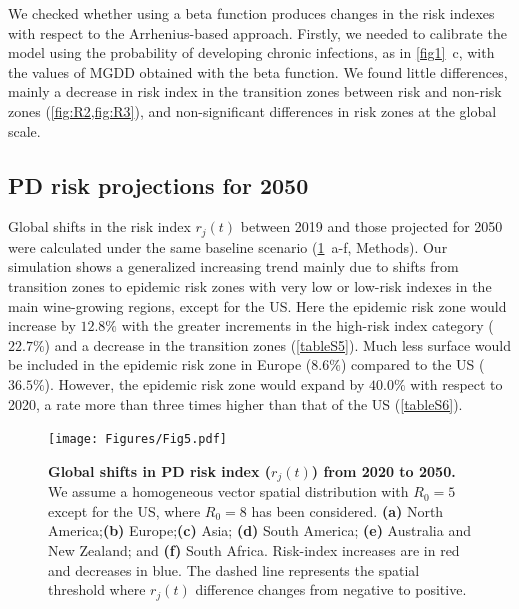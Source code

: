     We checked whether using a beta function produces changes in the risk
    indexes with respect to the Arrhenius-based approach. Firstly, we needed to
    calibrate the model using the probability of developing chronic infections,
    as in \cref{fig1}~\textcolor{ref_color}{c}, with the values of MGDD
    obtained with the beta
    function. We found little differences, mainly a decrease in risk index in
    the transition zones between risk and non-risk zones
    (\cref{fig:R2,fig:R3}), and non-significant differences in risk zones at
    the global scale.

    \subsection{PD risk projections for 2050}

    Global shifts in the risk index $r_j(t)$ between 2019 and those projected
    for 2050 were calculated under the same baseline scenario
    (\cref{fig5}~\textcolor{ref_color}{a-f},
    Methods). Our simulation shows a generalized increasing trend mainly due to
    shifts from transition zones to epidemic risk zones with very low or
    low-risk indexes in the main wine-growing regions, except for the US. Here
    the epidemic risk zone would increase by $12.8\%$ with the greater
    increments in the high-risk index category ($22.7\%$) and a decrease in the
    transition zones (\cref{tableS5}). Much less surface would be
    included in the epidemic risk zone in Europe ($8.6\%$) compared to the US
    ($36.5\%$). However, the epidemic risk zone would expand by $40.0\%$ with
    respect to 2020, a rate more than three times higher than
    that of the US (\cref{tableS6}).

    \begin{figure}[H]
        \centering
        \texttt{[image: Figures/Fig5.pdf]}
        \caption[Global shifts in PD risk index ($r_j(t)$) from 2020 to
            2050]{\textbf{Global shifts in PD risk index ($r_j(t)$) from 2020
                to
                2050.} We assume a homogeneous vector spatial distribution with
            $R_0=5$ except for the US, where $R_0=8$ has been
            considered. \textbf{(a)} North America;\textbf{(b)}
            Europe;\textbf{(c)} Asia; \textbf{(d)} South America; \textbf{(e)}
            Australia
            and New Zealand; and \textbf{(f)} South Africa. Risk-index
            increases are in red
            and decreases in blue. The dashed line represents the spatial
            threshold where
            $r_j(t)$ difference changes from negative to positive.}
        \label{fig5}
    \end{figure}

